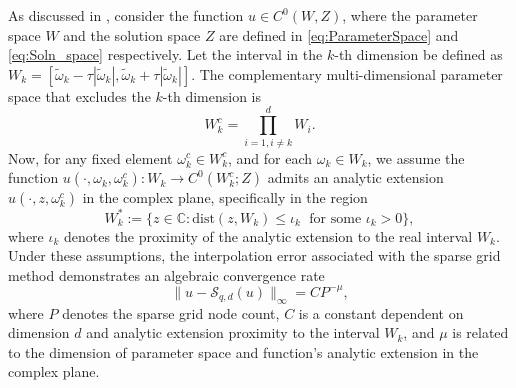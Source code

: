 As discussed in \cite{NoTeWe:2008,TeJaWe:2015}, consider the function $u \in C^0(W,Z)$, where the parameter space $W$ and the solution space $Z$ are defined in \eqref{eq:ParameterSpace} and \eqref{eq:Soln_space} respectively. Let the interval in the $k$-th dimension be defined as $W_k = \left[\widetilde{\omega}_k-\tau \left\vert \widetilde{\omega}_k\right\vert, \widetilde{\omega}_k+\tau \left\vert \widetilde{\omega}_k\right\vert\right]$. The complementary multi-dimensional parameter space that excludes the $k$-th dimension is 
%
\[
W_k^c = \prod_{i=1, i\neq k}^d W_i.
\]
%
Now, for any fixed element $\omega_k^c \in W_k^c$, and for each $\omega_k\in W_k$, we assume the function $u(\cdot,\omega_k,\omega_k^c): W_k \rightarrow C^0(W_k^c;Z)$ admits an analytic extension  $u(\cdot, z,\omega_k^c)$ in the complex plane, specifically in the region 
%
\[
W_k^{*}:=\{z\in \mathbb{C}: \text{dist} (z,W_k)\le \iota_k \;\text{ for some } \iota_k>0\},
\]
%
where $\iota_k$ denotes the proximity of the analytic extension to the real interval $W_k$. Under these assumptions, the interpolation error associated with the sparse grid method demonstrates an algebraic convergence rate
%
\begin{equation} \label{eq:coll-error-bound_2}
  \big\|u-\mathcal{S}_{q, d} (u)\big\|_\infty = C P^{-\mu},
\end{equation}
%
where $P$ denotes the sparse grid node count, $C$ is a constant dependent on dimension $d$ and analytic extension proximity to the interval $W_k$, and $\displaystyle \mu$ is related to the dimension of parameter space and function's analytic extension in the complex plane.

